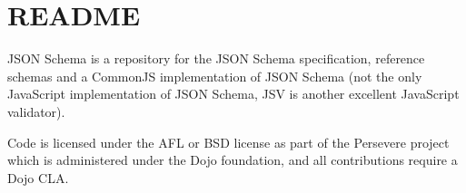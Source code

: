 \chapter{README}
\hypertarget{md__c_1_2_users_2_s_t_r_i_d_e_r_2source_2repos_2_ainslie_a_p_i_2wwwroot_2lib_2jquery-ui_2node__me792677093ede47b9aa9d168ed34c32d}{}\label{md__c_1_2_users_2_s_t_r_i_d_e_r_2source_2repos_2_ainslie_a_p_i_2wwwroot_2lib_2jquery-ui_2node__me792677093ede47b9aa9d168ed34c32d}
JSON Schema is a repository for the JSON Schema specification, reference schemas and a Common\+JS implementation of JSON Schema (not the only Java\+Script implementation of JSON Schema, JSV is another excellent Java\+Script validator).

Code is licensed under the AFL or BSD license as part of the Persevere project which is administered under the Dojo foundation, and all contributions require a Dojo CLA. 